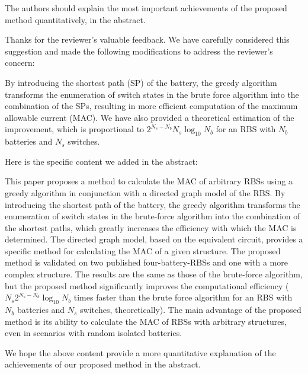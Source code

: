 \reviewer
\begin{revcomment}
  The authors should explain the most important achievements of the proposed method quantitatively, in the abstract.
\end{revcomment}
\begin{revresponse}

Thanks for the reviewer's valuable feedback. We have carefully considered this suggestion and made the following modifications to address the reviewer's concern:


By introducing the shortest path (SP) of the battery, the greedy algorithm transforms the enumeration of switch states in the brute force algorithm into the combination of the SPs, resulting in more efficient computation of the maximum allowable current (MAC).
We have also provided a theoretical estimation of the improvement, which is proportional to $2^{N_s - N_b} N_s \log_{10} N_b$ for an RBS with $N_b$ batteries and $N_s$ switches.


Here is the specific content we added in the abstract:
\begin{changes}
This paper proposes a method to calculate the MAC of arbitrary RBSs using a greedy algorithm in conjunction with a directed graph model of the RBS.
By introducing the shortest path of the battery, the greedy algorithm transforms the enumeration of switch states in the brute-force algorithm into the combination of the shortest paths, which greatly increases the efficiency with which the MAC is determined.
The directed graph model, based on the equivalent circuit, provides a specific method for calculating the MAC of a given structure.
The proposed method is validated on two published four-battery-RBSs and one with a more complex structure.
The results are the same as those of the brute-force algorithm, but the proposed method significantly improves the computational efficiency ($N_s 2^{N_s - N_b} \log_{10} N_b$ times faster than the brute force algorithm for an RBS with $N_b$ batteries and $N_s$ switches, theoretically).
The main advantage of the proposed method is its ability to calculate the MAC of RBSs with arbitrary structures, even in scenarios with random isolated batteries.
\end{changes}


We hope the above content provide a more quantitative explanation of the achievements of our proposed method in the abstract. 

\end{revresponse}

